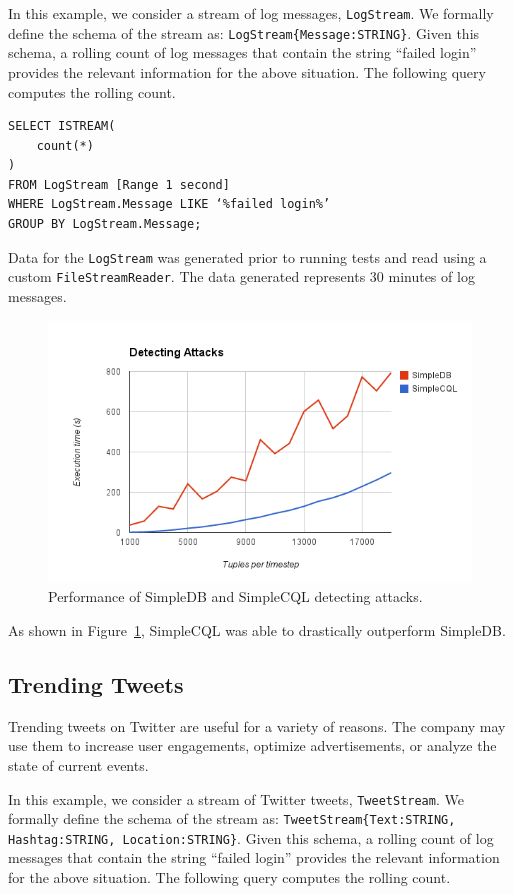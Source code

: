 \documentclass[a4paper, 10pt, conference]{IEEEconf}
\begin{document}
In this example, we consider a stream of log messages, \texttt{LogStream}. We formally define the schema of the stream as: \texttt{LogStream\{Message:STRING\}}.  Given this schema, a rolling count of log messages that contain the string “failed login” provides the relevant information for the above situation.  The following query computes the rolling count.

\begin{verbatim}
SELECT ISTREAM(
    count(*)
)
FROM LogStream [Range 1 second]
WHERE LogStream.Message LIKE ‘%failed login%’
GROUP BY LogStream.Message;
\end{verbatim}

Data for the \texttt{LogStream} was generated prior to running tests and read using a custom \texttt{FileStreamReader}.  The data generated represents 30 minutes of log messages.

\begin{figure}[tpH!]
    \centering
    \centerline{\includegraphics[totalheight=5cm]{attack.png}}
    \caption{Performance of SimpleDB and SimpleCQL detecting attacks.}
    \label{fig:attack}
\end{figure}

As shown in Figure~\ref{fig:attack}, SimpleCQL was able to drastically outperform SimpleDB.

\subsection{Trending Tweets}
Trending tweets on Twitter are useful for a variety of reasons.  The company may use them to increase user engagements, optimize advertisements, or analyze the state of current events.  

In this example, we consider a stream of Twitter tweets, \texttt{TweetStream}. We formally define the schema of the stream as: \texttt{TweetStream\{Text:STRING, Hashtag:STRING, Location:STRING\}}.  Given this schema, a rolling count of log messages that contain the string “failed login” provides the relevant information for the above situation.  The following query computes the rolling count.
\end{document}
